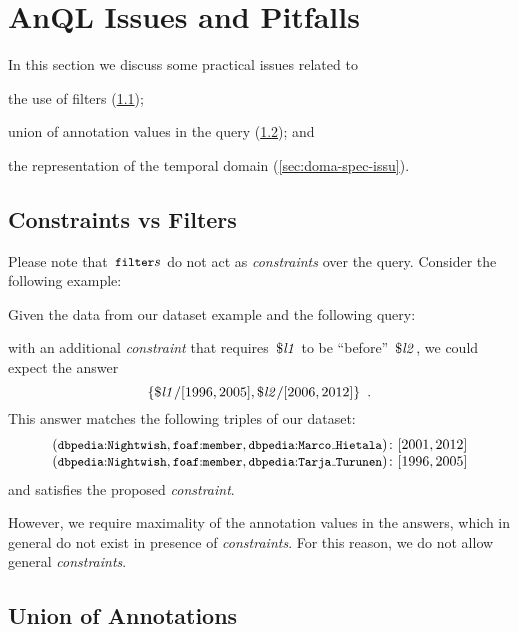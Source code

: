 \section{AnQL Issues and Pitfalls}
\label{sec:twists-asparql}


In this section we discuss some practical issues related to
\begin{enumerate*}[label=(\roman*),noitemsep]
\item the use of filters (\cref{sec:constr-vs-filt});
\item union of annotation values in the query (\cref{sec:union-annotations}); and
\item the representation of the temporal domain (\cref{sec:doma-spec-issu}).
\end{enumerate*}


\subsection{Constraints vs Filters}\label{sec:constr-vs-filt}
Please note that~$\texttt{{\small filter}}{s}$ do not act as \emph{constraints} over the query.  Consider the following example:
%
\begin{example}
  Given the data from our dataset example and the following query:
  
  with an additional \emph{constraint} that requires~$\$\mathit{l1}$ to be ``before''~$\$\mathit{l2}$, we could expect the answer
  \[
  \{\$\mathit{l1}/[1996, 2005], \$\mathit{l2}/[2006, 2012]\} \enspace .
  \] 
  This answer matches the following triples of our dataset:
    \[
    \begin{array}{l}
      \fuzzyg{\triple{\qname{dbpedia}{Nightwish}, \qname{foaf}{member}, \qname{dbpedia}{Marco\mathunderscore{}Hietala}}}{[2001,2012]} \\
      \fuzzyg{\triple{\qname{dbpedia}{Nightwish}, \qname{foaf}{member}, \qname{dbpedia}{Tarja\mathunderscore{}Turunen}}}{[1996,2005]} \\
    \end{array}
    \]
  \nd and satisfies the proposed \emph{constraint}.  
\end{example}
%
However, we require maximality of the annotation values in the answers, which in general do not exist in presence of
\emph{constraints}. For this reason, we do not allow general \emph{constraints}.


\subsection{Union of Annotations}
\label{sec:union-annotations}

